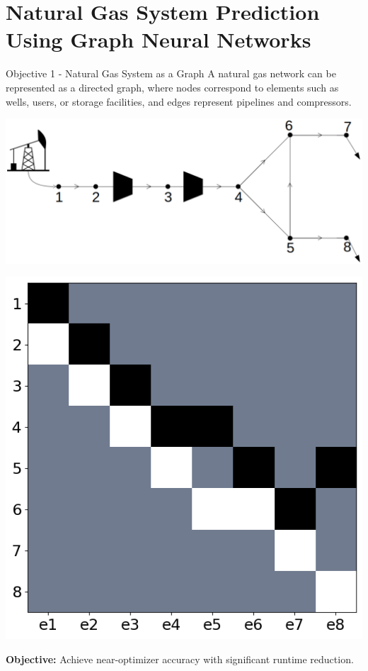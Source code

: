 \documentclass[hyperref={colorlinks,citecolor=blue,linkcolor=blue,urlcolor=blue}]{beamer}
\begin{document}
\section{Natural Gas System Prediction Using Graph Neural Networks}
\begin{frame}{Objective 1 - Natural Gas System as a Graph}
    \footnotesize
    \justifying
    A natural gas network can be represented as a directed graph, 
    where nodes correspond to elements such as wells, users, or storage facilities, 
    and edges represent pipelines and compressors.
    
    \begin{minipage}[c]{0.48\linewidth}
        \centering
        \includegraphics[width=1\linewidth]{figures/8_node_system.png} 
    \end{minipage}\hfill
    \begin{minipage}[c]{0.48\linewidth}
        \centering
        \includegraphics[width=0.65\linewidth]{figures/incidence_matrix.png} 
    \end{minipage}
    
    \vspace{0.3cm}
    \textbf{Objective:} Achieve near-optimizer accuracy with significant runtime reduction.
\end{frame}
\end{document}
